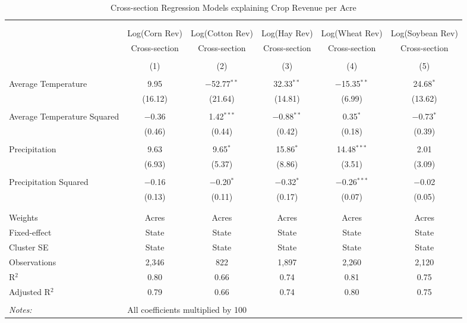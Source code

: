 \documentclass[10pt]{article}
\begin{document}
\begin{table}[!htbp] \centering 
  \caption{Cross-section Regression Models explaining Crop Revenue per Acre} 
  \label{} 
\footnotesize 
\begin{tabular}{@{\extracolsep{5pt}}lccccc} 
\\[-1.8ex]\hline 
\hline \\[-1.8ex] 
\\[-1.8ex] & Log(Corn Rev) & Log(Cotton Rev) & Log(Hay Rev) & Log(Wheat Rev) & Log(Soybean Rev) \\ 
 & Cross-section & Cross-section & Cross-section & Cross-section & Cross-section \\ 
\\[-1.8ex] & (1) & (2) & (3) & (4) & (5)\\ 
\hline \\[-1.8ex] 
 Average Temperature & 9.95 & $-$52.77$^{**}$ & 32.33$^{**}$ & $-$15.35$^{**}$ & 24.68$^{*}$ \\ 
  & (16.12) & (21.64) & (14.81) & (6.99) & (13.62) \\ 
  & & & & & \\ 
 Average Temperature Squared & $-$0.36 & 1.42$^{***}$ & $-$0.88$^{**}$ & 0.35$^{*}$ & $-$0.73$^{*}$ \\ 
  & (0.46) & (0.44) & (0.42) & (0.18) & (0.39) \\ 
  & & & & & \\ 
 Precipitation & 9.63 & 9.65$^{*}$ & 15.86$^{*}$ & 14.48$^{***}$ & 2.01 \\ 
  & (6.93) & (5.37) & (8.86) & (3.51) & (3.09) \\ 
  & & & & & \\ 
 Precipitation Squared & $-$0.16 & $-$0.20$^{*}$ & $-$0.32$^{*}$ & $-$0.26$^{***}$ & $-$0.02 \\ 
  & (0.13) & (0.11) & (0.17) & (0.07) & (0.05) \\ 
  & & & & & \\ 
\hline \\[-1.8ex] 
Weights & Acres & Acres & Acres & Acres & Acres \\ 
Fixed-effect & State & State & State & State & State \\ 
Cluster SE & State & State & State & State & State \\ 
Observations & 2,346 & 822 & 1,897 & 2,260 & 2,120 \\ 
R$^{2}$ & 0.80 & 0.66 & 0.74 & 0.81 & 0.75 \\ 
Adjusted R$^{2}$ & 0.79 & 0.66 & 0.74 & 0.80 & 0.75 \\ 
\hline 
\hline \\[-1.8ex] 
\textit{Notes:} & \multicolumn{5}{l}{All coefficients multiplied by 100} \\ 
\end{tabular} 
\end{table} 
\end{document}
